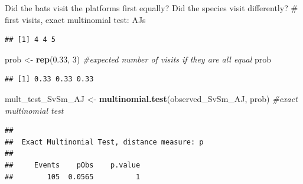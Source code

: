\documentclass[]{article}
\newenvironment{Shaded}{\begin{snugshade}}{\end{snugshade}}
\newcommand{\KeywordTok}[1]{\textcolor[rgb]{0.13,0.29,0.53}{\textbf{{#1}}}}
\newcommand{\DecValTok}[1]{\textcolor[rgb]{0.00,0.00,0.81}{{#1}}}
\newcommand{\FloatTok}[1]{\textcolor[rgb]{0.00,0.00,0.81}{{#1}}}
\newcommand{\StringTok}[1]{\textcolor[rgb]{0.31,0.60,0.02}{{#1}}}
\newcommand{\CommentTok}[1]{\textcolor[rgb]{0.56,0.35,0.01}{\textit{{#1}}}}
\newcommand{\NormalTok}[1]{{#1}}
\begin{document}
Did the bats visit the platforms first equally? Did the species visit
differently? \# first visits, exact multinomial test: AJs

\begin{Shaded}
\end{Shaded}

\begin{verbatim}
## [1] 4 4 5
\end{verbatim}

\begin{Shaded}
\begin{Highlighting}[]
\NormalTok{prob <-}\StringTok{ }\KeywordTok{rep}\NormalTok{(}\FloatTok{0.33}\NormalTok{, }\DecValTok{3}\NormalTok{) }\CommentTok{#expected number of visits if they are all equal}
\NormalTok{prob }
\end{Highlighting}
\end{Shaded}

\begin{verbatim}
## [1] 0.33 0.33 0.33
\end{verbatim}

\begin{Shaded}
\begin{Highlighting}[]
\NormalTok{mult_test_SvSm_AJ <-}\StringTok{ }\KeywordTok{multinomial.test}\NormalTok{(observed_SvSm_AJ, prob) }\CommentTok{#exact multinomial test}
\end{Highlighting}
\end{Shaded}

\begin{verbatim}
## 
##  Exact Multinomial Test, distance measure: p
## 
##     Events    pObs    p.value
##        105  0.0565          1
\end{verbatim}
\end{document}

